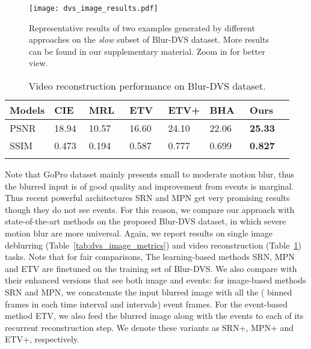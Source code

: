 \documentclass[10pt,twocolumn,letterpaper]{article}
\begin{document}
\begin{figure*}[t!]
	\centering
	\texttt{[image: dvs\_image\_results.pdf]}
	\caption{Representative results of two examples generated by different approaches on the \textit{slow} subset of Blur-DVS dataset. More results can be found in our supplementary material. Zoom in for better view.} 
	\label{fig:dvs_image_results}
	\vspace{-2mm}
\end{figure*}


\begin{table}[t!]
	\centering
	\small
	\caption{Video reconstruction performance on Blur-DVS dataset.}
	\begin{tabularx}{\columnwidth}{p{0.65cm}<{\centering}p{0.8cm}<{\centering}p{0.95cm}<{\centering}p{0.95cm}<{\centering}p{0.5cm}<{\centering}p{1.0cm}<{\centering}p{0.7cm}<{\centering}p{0.6cm}<{\centering}}
		\toprule
		Models & CIE~\cite{ScheerlinckACCV18} & MRL~\cite{MundaIJCV18} & ETV~\cite{RebecqCVPR19} & ETV+ & BHA~\cite{PanCVPR19} & Ours \\
		\midrule
		PSNR & 18.94 & 10.57 & 16.60 & 24.10 & 22.06 & \textbf{25.33} \\
		SSIM & 0.473 & 0.194 & 0.587 & 0.777 & 0.699 & \textbf{0.827} \\
		\bottomrule
		\label{tab:dvs_video_metrics}
	\end{tabularx}
	\vspace{-10mm}
\end{table}

Note that GoPro dataset mainly presents small to moderate motion blur, thus the blurred input is of good quality and improvement from events is marginal. Thus recent powerful architectures SRN and MPN get very promising results though they do not see events. For this reason, we compare our approach with state-of-the-art methods on the proposed Blur-DVS dataset, in which severe motion blur are more universal. Again, we report results on single image deblurring (Table~\ref{tab:dvs_image_metrics}) and video reconstruction (Table~\ref{tab:dvs_video_metrics}) tasks. Note that for fair comparisons, The learning-based methods SRN, MPN and ETV are finetuned on the training set of Blur-DVS. We also compare with their enhanced versions that see both image and events: for image-based methods SRN and MPN, we concatenate the input blurred image with all the  ( binned frames in each time interval and  intervals) event frames. For the event-based method ETV, we also feed the blurred image along with the events to each of its recurrent reconstruction step. We denote these variants as SRN+, MPN+ and ETV+, respectively.
\end{document}
